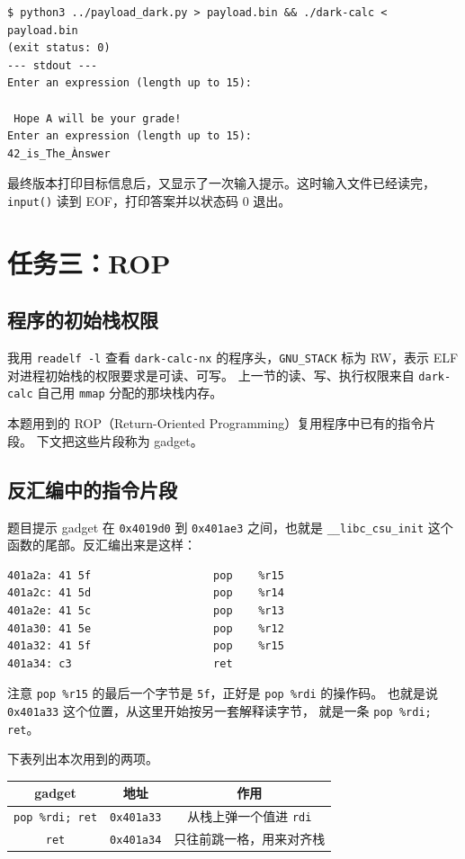 \documentclass[UTF8,a4paper,12pt,fontset=windows]{ctexart}
\newcommand{\code}[1]{\texttt{#1}}
\begin{document}
\begin{lstlisting}
$ python3 ../payload_dark.py > payload.bin && ./dark-calc < payload.bin
(exit status: 0)
--- stdout ---
Enter an expression (length up to 15):

 Hope A will be your grade!
Enter an expression (length up to 15):
42_is_The_Ànswer
\end{lstlisting}

最终版本打印目标信息后，又显示了一次输入提示。这时输入文件已经读完，
\code{input()} 读到 EOF，打印答案并以状态码 0 退出。

\section{任务三：ROP}

\subsection{程序的初始栈权限}

我用 \code{readelf -l} 查看 \code{dark-calc-nx} 的程序头，\code{GNU\_STACK}
标为 RW，表示 ELF 对进程初始栈的权限要求是可读、可写。
上一节的读、写、执行权限来自 \code{dark-calc} 自己用 \code{mmap} 分配的那块栈内存。

本题用到的 ROP（Return-Oriented Programming）复用程序中已有的指令片段。
下文把这些片段称为 gadget。

\subsection{反汇编中的指令片段}

题目提示 gadget 在 \code{0x4019d0} 到 \code{0x401ae3} 之间，也就是
\code{\_\_libc\_csu\_init} 这个函数的尾部。反汇编出来是这样：

\begin{lstlisting}
401a2a:	41 5f                	pop    %r15
401a2c:	41 5d                	pop    %r14
401a2e:	41 5c                	pop    %r13
401a30:	41 5e                	pop    %r12
401a32:	41 5f                	pop    %r15
401a34:	c3                   	ret
\end{lstlisting}

注意 \code{pop \%r15} 的最后一个字节是 \code{5f}，正好是 \code{pop \%rdi} 的操作码。
也就是说 \code{0x401a33} 这个位置，从这里开始按另一套解释读字节，
就是一条 \code{pop \%rdi; ret}。

下表列出本次用到的两项。

\begin{center}
\begin{tabular}{|c|c|c|}
\hline
gadget & 地址 & 作用 \\
\hline
\code{pop \%rdi; ret} & \code{0x401a33} & 从栈上弹一个值进 \code{rdi} \\
\hline
\code{ret} & \code{0x401a34} & 只往前跳一格，用来对齐栈 \\
\hline
\end{tabular}
\end{center}
\end{document}
